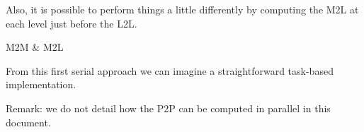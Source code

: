 \documentclass[12pt,letterpaper,titlepage]{report}
\begin{document}
\BlankLine
Also, it is possible to perform things a little differently by computing the M2L at each level just before the L2L.
\BlankLine
\begin{algorithm}[H]
\linesnumbered
\SetLine
\BlankLine
{}
\BlankLine
\caption{M2M \& M2L}
\end{algorithm}
\BlankLine
From this first serial approach we can imagine a straightforward task-based implementation.

Remark: we do not detail how the P2P can be computed in parallel in this document.

\end{document}
